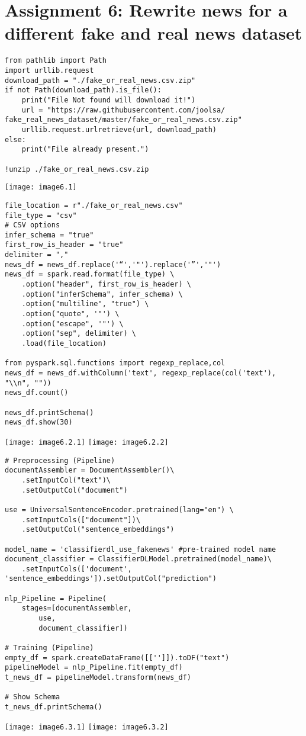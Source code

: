 \documentclass[]{article}
\begin{document}
\clearpage

\section*{Assignment 6: Rewrite news for a different fake and real news dataset}
\begin{verbatim}
from pathlib import Path
import urllib.request
download_path = "./fake_or_real_news.csv.zip"
if not Path(download_path).is_file():
	print("File Not found will download it!")
	url = "https://raw.githubusercontent.com/joolsa/ fake_real_news_dataset/master/fake_or_real_news.csv.zip"
	urllib.request.urlretrieve(url, download_path)
else:
	print("File already present.")

!unzip ./fake_or_real_news.csv.zip
\end{verbatim}
\texttt{[image: image6.1]} 

\clearpage

\begin{verbatim}
file_location = r"./fake_or_real_news.csv"
file_type = "csv"
# CSV options
infer_schema = "true"
first_row_is_header = "true"
delimiter = ","
news_df = news_df.replace('“','"').replace('”','"')
news_df = spark.read.format(file_type) \
	.option("header", first_row_is_header) \
	.option("inferSchema", infer_schema) \
	.option("multiline", "true") \
	.option("quote", '"') \
	.option("escape", '"') \
	.option("sep", delimiter) \
	.load(file_location)

from pyspark.sql.functions import regexp_replace,col
news_df = news_df.withColumn('text', regexp_replace(col('text'), "\\n", ""))
news_df.count()

news_df.printSchema()
news_df.show(30)
\end{verbatim}
\texttt{[image: image6.2.1]}
\texttt{[image: image6.2.2]}

\clearpage

\begin{verbatim}
# Preprocessing (Pipeline)
documentAssembler = DocumentAssembler()\
	.setInputCol("text")\
	.setOutputCol("document")

use = UniversalSentenceEncoder.pretrained(lang="en") \
	.setInputCols(["document"])\
	.setOutputCol("sentence_embeddings")

model_name = 'classifierdl_use_fakenews' #pre-trained model name
document_classifier = ClassifierDLModel.pretrained(model_name)\
	.setInputCols(['document', 
'sentence_embeddings']).setOutputCol("prediction")

nlp_Pipeline = Pipeline(
	stages=[documentAssembler, 
		use,
		document_classifier])

# Training (Pipeline)
empty_df = spark.createDataFrame([['']]).toDF("text")
pipelineModel = nlp_Pipeline.fit(empty_df)
t_news_df = pipelineModel.transform(news_df)

# Show Schema
t_news_df.printSchema()
\end{verbatim}
\texttt{[image: image6.3.1]} 
\texttt{[image: image6.3.2]} 
\end{document}
